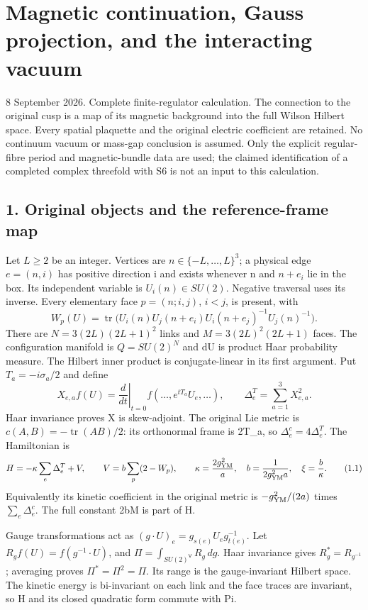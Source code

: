 \documentclass[
  11pt,
]{article}
\author{}
\date{}
\begin{document}
\section{Magnetic continuation, Gauss projection, and the interacting
vacuum}\label{magnetic-part-1-magnetic-continuation-gauss-projection-and-the-interacting-vacuum}

8 September 2026. Complete finite-regulator calculation. The connection
to the original cusp is a map of its magnetic background into the full
Wilson Hilbert space. Every spatial plaquette and the original electric
coefficient are retained. No continuum vacuum or mass-gap conclusion is
assumed. Only the explicit regular-fibre period and magnetic-bundle data
are used; the claimed identification of a completed complex threefold
with S6 is not an input to this calculation.

\subsection{1. Original objects and the reference-frame
map}\label{magnetic-part-1-original-objects-and-the-reference-frame-map}

Let \(L\ge2\) be an integer. Vertices are \(n\in\{-L,\ldots,L\}^3\); a
physical edge \(e=(n,i)\) has positive direction i and exists whenever n
and \(n+e_i\) lie in the box. Its independent variable is
\(U_i(n)\in SU(2)\). Negative traversal uses its inverse. Every
elementary face \(p=(n;i,j)\), \(i<j\), is present, with \[
 W_p(U)=\operatorname{tr}\bigl(U_i(n)U_j(n+e_i)
                 U_i(n+e_j)^{-1}U_j(n)^{-1}\bigr).
\] There are \(N=3(2L)(2L+1)^2\) links and \(M=3(2L)^2(2L+1)\) faces.
The configuration manifold is \(Q=SU(2)^N\) and dU is product Haar
probability measure. The Hilbert inner product is conjugate-linear in
its first argument. Put \(T_a=-i\sigma_a/2\) and define \[
 X_{e,a}f(U)=\left.\frac{d}{dt}\right|_{t=0}
 f(\ldots,e^{tT_a}U_e,\ldots),\qquad
 \Delta_e^T=\sum_{a=1}^3X_{e,a}^2.
\] Haar invariance proves X is skew-adjoint. The original Lie metric is
\(c(A,B)=-\operatorname{tr}(AB)/2\): its orthonormal frame is 2T\_a, so
\(\Delta_e^c=4\Delta_e^T\). The Hamiltonian is \[
 H=-\kappa\sum_e\Delta_e^T+V,\qquad
 V=b\sum_p(2-W_p),\qquad
 \kappa=\frac{2g_{\rm YM}^2}{a},\quad
 b=\frac{1}{2g_{\rm YM}^2a},\quad \xi=\frac b\kappa.
\tag{1.1}
\] Equivalently its kinetic coefficient in the original metric is
\(-g_{\rm YM}^2/(2a)\) times \(\sum_e\Delta_e^c\). The full constant 2bM
is part of H.

Gauge transformations act as \((g\cdot U)_e=g_{s(e)}U_eg_{t(e)}^{-1}\).
Let \(R_gf(U)=f(g^{-1}\cdot U)\), and
\(\Pi=\int_{SU(2)^{\mathsf V}}R_g\,dg\). Haar invariance gives
\(R_g^*=R_{g^{-1}}\); averaging proves \(\Pi^*=\Pi^2=\Pi\). Its range is
the gauge-invariant Hilbert space. The kinetic energy is bi-invariant on
each link and the face traces are invariant, so H and its closed
quadratic form commute with Pi.
\end{document}
